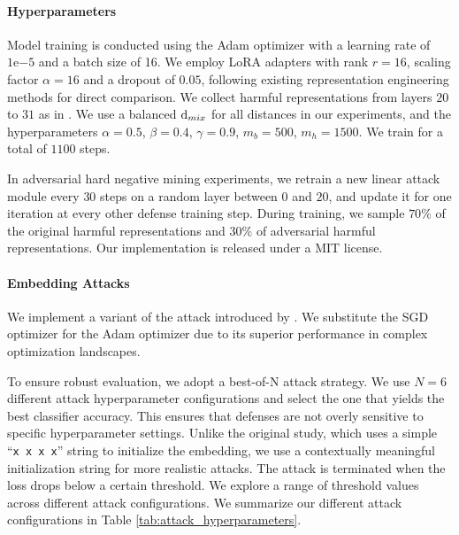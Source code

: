 \documentclass[11pt]{article}
\begin{document}
\paragraph{Hyperparameters}
\label{app:hyperparameter}
Model training is conducted using the Adam optimizer \citep{kingma2017adammethodstochasticoptimization} with a learning rate of $1\mathrm{e}{-5}$ and a batch size of 16.
We employ LoRA adapters with rank $r = 16$, scaling factor $\alpha = 16$ and a dropout of $0.05$,
following existing representation engineering methods for direct comparison.
We collect harmful representations from layers $20$ to $31$ as in \citet{yousefpour2025representationbendinglargelanguage}. We use a balanced $\text{d}_{mix}$ for all distances in our experiments, and the hyperparameters $\alpha = 0.5$, $\beta = 0.4$, $\gamma = 0.9$, $m_b = 500$, $m_h = 1500$. We train for a total of $1100$ steps.

In adversarial hard negative mining experiments, we retrain a new linear attack module every $30$ steps on a random layer between $0$ and $20$, and update it for one iteration at every other defense training step. During training, we sample $70\%$ of the original harmful representations and $30\%$ of adversarial harmful representations.
Our implementation is released under a MIT license.

\paragraph{Embedding Attacks}
\label{par:embedding}
We implement a variant of the attack introduced by \citet{zou2024improvingalignmentrobustnesscircuit}.
We substitute the SGD optimizer for the Adam optimizer \citep{kingma2017adammethodstochasticoptimization} due to its superior performance in complex optimization landscapes.

To ensure robust evaluation, we adopt a best-of-N attack strategy. We use $N=6$ different attack hyperparameter configurations and select the one that yields the best classifier accuracy.
This ensures that defenses are not overly sensitive to specific hyperparameter settings.
Unlike the original study, which uses a simple ``\texttt{x x x x}'' string to initialize the embedding, we use a contextually meaningful initialization string for more realistic attacks.
The attack is terminated when the loss drops below a certain threshold. We explore a range of threshold values
across different attack configurations.
We summarize our different attack configurations in Table \ref{tab:attack_hyperparameters}.
\end{document}
